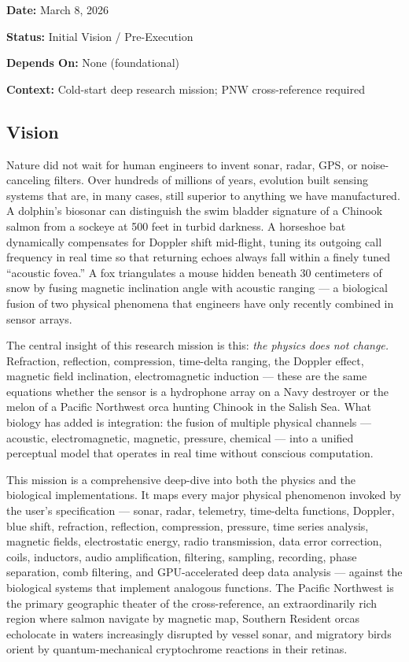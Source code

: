 \documentclass[11pt,letterpaper]{article}
\newcommand{\metafield}[2]{\textbf{\sffamily #1} #2\par}
\begin{document}
\metafield{Date:}{March 8, 2026}
\metafield{Status:}{Initial Vision / Pre-Execution}
\metafield{Depends On:}{None (foundational)}
\metafield{Context:}{Cold-start deep research mission; PNW cross-reference required}

\subsection{Vision}

Nature did not wait for human engineers to invent sonar, radar, GPS, or noise-canceling filters. Over hundreds of millions of years, evolution built sensing systems that are, in many cases, still superior to anything we have manufactured. A dolphin's biosonar can distinguish the swim bladder signature of a Chinook salmon from a sockeye at 500 feet in turbid darkness. A horseshoe bat dynamically compensates for Doppler shift mid-flight, tuning its outgoing call frequency in real time so that returning echoes always fall within a finely tuned ``acoustic fovea.'' A fox triangulates a mouse hidden beneath 30 centimeters of snow by fusing magnetic inclination angle with acoustic ranging --- a biological fusion of two physical phenomena that engineers have only recently combined in sensor arrays.

The central insight of this research mission is this: \textit{the physics does not change.} Refraction, reflection, compression, time-delta ranging, the Doppler effect, magnetic field inclination, electromagnetic induction --- these are the same equations whether the sensor is a hydrophone array on a Navy destroyer or the melon of a Pacific Northwest orca hunting Chinook in the Salish Sea. What biology has added is integration: the fusion of multiple physical channels --- acoustic, electromagnetic, magnetic, pressure, chemical --- into a unified perceptual model that operates in real time without conscious computation.

This mission is a comprehensive deep-dive into both the physics and the biological implementations. It maps every major physical phenomenon invoked by the user's specification --- sonar, radar, telemetry, time-delta functions, Doppler, blue shift, refraction, reflection, compression, pressure, time series analysis, magnetic fields, electrostatic energy, radio transmission, data error correction, coils, inductors, audio amplification, filtering, sampling, recording, phase separation, comb filtering, and GPU-accelerated deep data analysis --- against the biological systems that implement analogous functions. The Pacific Northwest is the primary geographic theater of the cross-reference, an extraordinarily rich region where salmon navigate by magnetic map, Southern Resident orcas echolocate in waters increasingly disrupted by vessel sonar, and migratory birds orient by quantum-mechanical cryptochrome reactions in their retinas.
\end{document}
